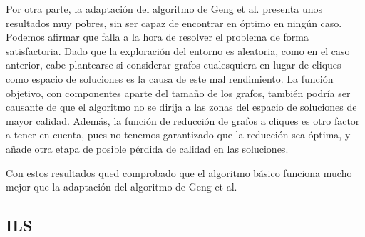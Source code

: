 Por otra parte, la adaptación del algoritmo de Geng et al. presenta unos resultados
muy pobres, sin ser capaz de encontrar en óptimo en ningún caso. Podemos afirmar que
falla a la hora de resolver el problema de forma satisfactoria. Dado que la exploración
del entorno es aleatoria, como en el caso anterior, cabe plantearse si considerar grafos
cualesquiera en lugar de cliques como espacio de soluciones es la causa de este mal
rendimiento. La función objetivo, con componentes aparte del tamaño de los grafos,
también podría ser causante de que el algoritmo no se dirija a las zonas del espacio
de soluciones de mayor calidad. Además, la función de reducción de grafos a cliques
es otro factor a tener en cuenta, pues no tenemos garantizado que la reducción sea
óptima, y añade otra etapa de posible pérdida de calidad en las soluciones.

Con estos resultados qued comprobado que el algoritmo básico funciona mucho
mejor que la adaptación del algoritmo de Geng et al.

\subsection{ILS}

